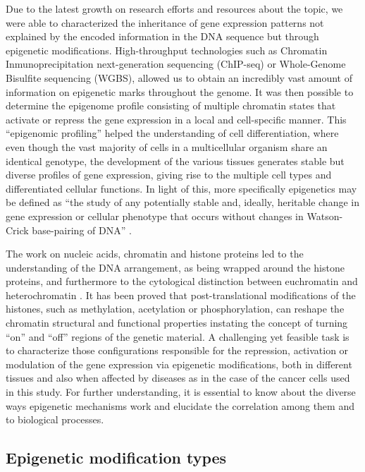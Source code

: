Due to the latest growth on research efforts and resources about the topic, we were able to characterized the inheritance of gene expression patterns not explained by the encoded information in the DNA sequence but through epigenetic modifications. High-throughput technologies such as Chromatin Inmunoprecipitation next-generation sequencing (ChIP-seq) or Whole-Genome Bisulfite sequencing (WGBS), allowed us to obtain an incredibly vast amount of information on epigenetic marks throughout the genome. It was then possible to determine the epigenome profile consisting of multiple chromatin states that activate or repress the gene expression in a local and cell-specific manner. This ``epigenomic profiling'' helped the understanding of cell differentiation, where even though the vast majority of cells in a multicellular organism share an identical genotype, the development of the various tissues generates stable but diverse profiles of gene expression, giving rise to the multiple cell types and differentiated cellular functions. In light of this, more specifically epigenetics may be defined as “the study of any potentially stable and, ideally, heritable change in gene expression or cellular phenotype that occurs without changes in Watson-Crick base-pairing of DNA” \cite{Goldberg2007}.

\medskip

The work on nucleic acids, chromatin and histone proteins led to the understanding of the DNA arrangement, as being wrapped around the histone proteins, and furthermore to the cytological distinction between euchromatin and heterochromatin \cite{Elgin1996}. It has been proved that post-translational modifications of the histones, such as methylation, acetylation or phosphorylation, can reshape the chromatin structural and functional properties instating the concept of turning ``on'' and ``off'' regions of the genetic material. A challenging yet feasible task is to characterize those configurations responsible for the repression, activation or modulation of the gene expression via epigenetic modifications, both in different tissues and also when affected by diseases as in the case of the cancer cells used in this study. For further understanding, it is essential to know about the diverse ways epigenetic mechanisms work and elucidate the correlation among them and to biological processes.

\subsection{Epigenetic modification types}


